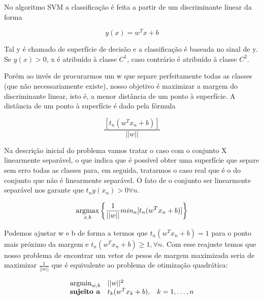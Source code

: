No algoritmo SVM a classificação é feita a partir de um discriminante linear
da forma 

\begin{center}
	\begin{equation}\label{eq:svm-discriminant}
		y(x) = w^Tx + b
	\end{equation}
\end{center}

Tal y é chamado de superfície de decisão e a classificação é baseada no sinal de
y. Se $y(x) > 0$, x é atribuído à classe $C^1$, caso contrário é atribuído à classe
$C^2$.

Porém ao invés de procurarmos um w que separe perfeitamente todas as classes (que
não necessariamente existe), nosso objetivo é maximizar a margem do discriminante
linear, isto é, a menor distância de um ponto à superfície. A distância de um ponto à
superfície é dado pela fórmula

\begin{center}
	\begin{equation}
		\frac{[t_n(w^Tx_n + b)]}{||w||}
	\end{equation}
\end{center}
 
Na descrição inicial do problema vamos tratar o caso com o conjunto X linearmente separável, 
o que indica que é possível obter uma superfície que separe sem erro todas as classes para, em
seguida, tratarmos o caso real que é o do conjunto que não é linearmente separável.
O fato de o conjunto ser linearmente separável nos garante que $t_ny(x_n) >0 \forall n$.


\begin{center}
	\begin{equation}
		\operatorname*{argmax}_{x, b} \left\{ \frac{1}{||w||} min_n [t_n(w^Tx_n + b)] \right\}
	\end{equation}
\end{center}


Podemos ajustar w e b de forma a termos que $t_n(w^Tx_n + b) = 1$ para o ponto mais
próximo da margem e $t_n(w^Tx_n + b) \ge 1, \forall n$. Com esse reajuste temos que nosso
problema de encontrar um vetor de pesos de margem maximizada seria de maximizar 
$\frac{1}{||w||}$ que é equivalente ao problema de otimização quadrática:

\begin{center}
	\begin{equation}
		\begin{array}{ll@{}ll}
				\argmin_{w, b} & ||w||^2 &\\
				\textbf{sujeito a}& t_k(w^Tx_k + b), &&k = 1, \ldots ,n 
		\end{array}
	\end{equation}
\end{center}

